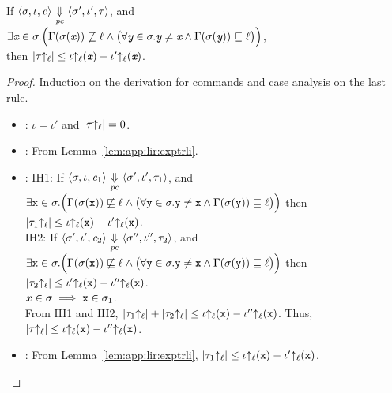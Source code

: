 \begin{myThm}
\label{lem:app:lir:cmdtrli}
If $\langle \sigma, \iota, \mathit{c} \rangle {~\underset{\mathit{pc}}{\Downarrow}~} \langle
  \sigma', \iota', \tau \rangle$, and \\
$\exists \emph{\texttt{x}} \in \sigma. \Big(\Gamma(\sigma(\emph{\texttt{x}}))
\not\sqsubseteq \ell \wedge \big(\forall \emph{\texttt{y}} \in
\sigma. \emph{\texttt{y}} \neq \emph{\texttt{x}} \wedge
\Gamma(\sigma(\emph{\texttt{y}})) \sqsubseteq \ell\big)\Big)$, \\  then 
$|\tau{\uparrow_\ell}| \leq \iota{\uparrow_\ell}(\emph{\texttt{x}}) - \iota'{\uparrow_\ell}(\emph{\texttt{x}})$. 
\end{myThm}
\begin{proof}
  Induction on the derivation for commands and case analysis on the
  last rule.  
  \begin{itemize}[leftmargin=.5in]
    \item{}: $\iota = \iota'$ and $|\tau{\uparrow_\ell}| = 0$. 
    \item{}: From Lemma~\ref{lem:app:lir:exptrli}.
    \item{}: IH1: If $\langle \sigma, \iota, \mathit{c}_1 \rangle
      {~\underset{\mathit{pc}}{\Downarrow}~} \langle \sigma', \iota', \tau_1 \rangle$, and \\
      $\exists \texttt{x} \in \sigma. \Big(\Gamma(\sigma(\texttt{x}))
      \not\sqsubseteq \ell \wedge \big(\forall \texttt{y} \in
      \sigma. \texttt{y} \neq \texttt{x} \wedge 
      \Gamma(\sigma(\texttt{y})) \sqsubseteq \ell\big)\Big)$ then 
      $|\tau_1{\uparrow_\ell}| \leq \iota{\uparrow_\ell}(\texttt{x}) - \iota'{\uparrow_\ell}(\texttt{x})$. \\
      IH2: If $\langle \sigma', \iota', \mathit{c}_2 \rangle
      {~\underset{\mathit{pc}}{\Downarrow}~} \langle \sigma'', \iota'', \tau_2 \rangle$, and\\
      $\exists \texttt{x} \in \sigma. \Big(\Gamma(\sigma(\texttt{x}))
      \not\sqsubseteq \ell \wedge \big(\forall \texttt{y} \in \sigma. \texttt{y} \neq \texttt{x} \wedge
      \Gamma(\sigma(\texttt{y})) \sqsubseteq \ell\big)\Big)$ then 
      $|\tau_2{\uparrow_\ell}| \leq \iota'{\uparrow_\ell}(\texttt{x}) - \iota''{\uparrow_\ell}(\texttt{x})$. \\
      $x \in \sigma \implies \texttt{x} \in \sigma_1$.\\
      From IH1 and IH2, $|\tau_1{\uparrow_\ell}| + |\tau_2{\uparrow_\ell}| \leq
      \iota{\uparrow_\ell}(\texttt{x}) - \iota''{\uparrow_\ell}(\texttt{x})$. Thus, $|\tau{\uparrow_\ell}| \leq \iota{\uparrow_\ell}(\texttt{x})
      - \iota''{\uparrow_\ell}(\texttt{x})$. 
    \item{}: From Lemma~\ref{lem:app:lir:exptrli}, $|\tau_1{\uparrow_\ell}| \leq
      \iota{\uparrow_\ell}(\texttt{x}) - \iota'{\uparrow_\ell}(\texttt{x})$. \\

\end{itemize}
\end{proof}
